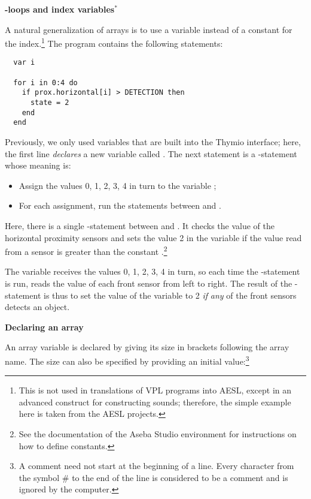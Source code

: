 \textbf{\large {}-loops and index variables$^*$}

A natural generalization of arrays is to use a variable instead of a
constant for the index.\footnote{This is not used in translations of VPL
programs into AESL, except in an advanced construct for constructing
sounds; therefore, the simple example here is taken from the AESL
projects.} The program  contains the following statements:

\begin{footnotesize}
\begin{verbatim}
  var i

  for i in 0:4 do
    if prox.horizontal[i] > DETECTION then
      state = 2
    end
  end
\end{verbatim}
\end{footnotesize}

Previously, we only used variables that are built into the Thymio
interface; here, the first line \emph{declares} a new variable called
. The next statement is a -statement whose meaning is:

\begin{itemize}
\item Assign the values 0, 1, 2, 3, 4 in turn to the variable ;
\item For each assignment, run the statements between  and .
\end{itemize}

Here, there is a single -statement between  and . It
checks the value of the horizontal proximity sensors and sets the value
2 in the variable  if the value read from a sensor is greater
than the constant .\footnote{See the documentation of the 
Aseba Studio environment for instructions on how to define constants.}

The variable  receives the values 0, 1, 2, 3, 4 in turn, so each
time the -statement is run,  reads the value
of each front sensor from left to right. The result of the
-statement is thus to set the value of the variable  to
2 \emph{if} \emph{any} of the front sensors detects an object.

\textbf{\large Declaring an array}

An array variable is declared by giving its size in brackets following
the array name. The size can also be specified by providing an initial
value:\footnote{A comment need not start at the beginning of a line.
Every character from the symbol \# to the end of the line is considered
to be a comment and is ignored by the computer.} 

